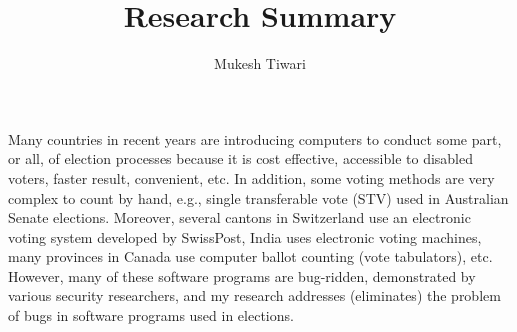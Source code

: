 \documentclass[a4paper]{article}
\title{Research Summary}
\author{Mukesh Tiwari}
\date{}
\begin{document}
\fontsize{12}{15}
\selectfont
\maketitle

Many countries in recent years are introducing computers to conduct some part, or all, of 
election processes because it is cost effective, accessible to disabled voters, faster result, convenient, etc. 
In addition, some voting methods are very complex to count by hand, e.g.,
single transferable vote (STV) used in Australian Senate elections.  Moreover, several cantons 
in Switzerland use an electronic 
voting system developed by SwissPost, India uses electronic voting machines, many provinces in 
Canada use computer ballot counting (vote tabulators), etc.  However, many of these software 
programs are bug-ridden, demonstrated by various security researchers, and my research addresses 
(eliminates) the problem of bugs in software programs used in elections.
\end{document}
